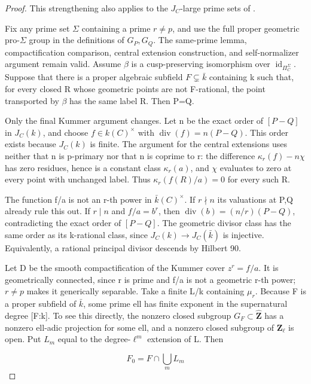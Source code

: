 \documentclass[11pt,a4paper]{article}
\begin{document}
\begin{proof}

This strengthening also applies to the \(J_C\)-large prime sets of \cite{LA_ST2017}.

Fix any prime set \({\Sigma}\) containing a prime \(r\ne p\), and use the full proper geometric pro-\({\Sigma}\) group in the definitions of \(G_P,G_Q\). The same-prime lemma, compactification comparison, central extension construction, and self-normalizer argument remain valid. Assume \({\beta}\) is a cusp-preserving isomorphism over \(\operatorname{id}_{{\Pi}_C^{\Sigma}}\). Suppose that there is a proper algebraic subfield \(F{\subsetneq}\bar k\) containing k such that, for every closed R whose geometric points are not F-rational, the point transported by \({\beta}\) has the same label R. Then P=Q.

Only the final Kummer argument changes. Let n be the exact order of \([P-Q]\) in \(J_C(k)\), and choose \(f{\in}k(C)^{\times}\) with \(\operatorname{div}(f)=n(P-Q)\). This order exists because \(J_C(k)\) is finite. The argument for the central extensions uses neither that n is p-primary nor that n is coprime to r: the difference \({\kappa}_r(f)-n{\chi}\) has zero residues, hence is a constant class \({\kappa}_r(a)\), and \({\chi}\) evaluates to zero at every point with unchanged label. Thus \({\kappa}_r(f(R)/a)=0\) for every such R.

The function f/a is not an r-th power in \(\bar k(C)^{\times}\). If \(r\nmid n\) its valuations at P,Q already rule this out. If \(r\mid n\) and \(f/a=b^r\), then \(\operatorname{div}(b)=(n/r)(P-Q)\), contradicting the exact order of \([P-Q]\). The geometric divisor class has the same order as its k-rational class, since \(J_C(k){\to}J_C(\bar k)\) is injective. Equivalently, a rational principal divisor descends by Hilbert 90.

Let D be the smooth compactification of the Kummer cover \(z^r=f/a\). It is geometrically connected, since r is prime and f/a is not a geometric r-th power; \(r{\ne}p\) makes it generically separable. Take a finite L/k containing \({\mu}_r\). Because F is a proper subfield of \(\bar k\), some prime ell has finite exponent in the supernatural degree {[}F:k{]}. To see this directly, the nonzero closed subgroup \(G_F{\subset}\widehat{\mathbf Z}\) has a nonzero ell-adic projection for some ell, and a nonzero closed subgroup of \(\mathbf{Z}_\ell\) is open. Put \(L_m\) equal to the degree-\(\ell^m\) extension of L. Then

\[F_0=F\cap\bigcup_m L_m\]


\end{proof}
\end{document}
